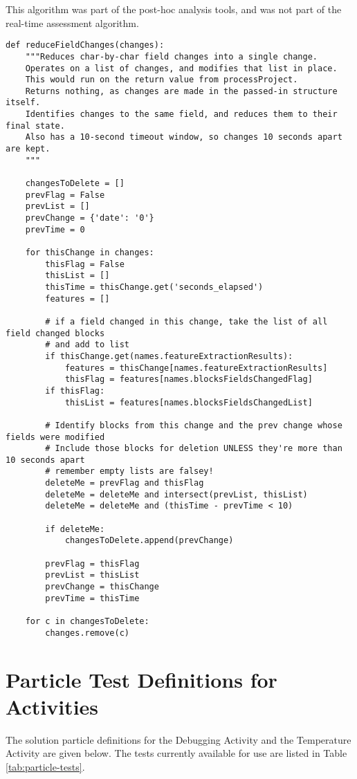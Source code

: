 This algorithm was part of the post-hoc analysis tools, and was not part of the real-time assessment algorithm.
\begin{verbatim}
def reduceFieldChanges(changes):
    """Reduces char-by-char field changes into a single change.
    Operates on a list of changes, and modifies that list in place.
    This would run on the return value from processProject.
    Returns nothing, as changes are made in the passed-in structure itself.
    Identifies changes to the same field, and reduces them to their final state.
    Also has a 10-second timeout window, so changes 10 seconds apart are kept.
    """

    changesToDelete = []
    prevFlag = False
    prevList = []
    prevChange = {'date': '0'}
    prevTime = 0

    for thisChange in changes:
        thisFlag = False
        thisList = []
        thisTime = thisChange.get('seconds_elapsed')
        features = []

        # if a field changed in this change, take the list of all field changed blocks 
        # and add to list
        if thisChange.get(names.featureExtractionResults):
            features = thisChange[names.featureExtractionResults]
            thisFlag = features[names.blocksFieldsChangedFlag]
        if thisFlag:
            thisList = features[names.blocksFieldsChangedList]

        # Identify blocks from this change and the prev change whose fields were modified
        # Include those blocks for deletion UNLESS they're more than 10 seconds apart
        # remember empty lists are falsey!
        deleteMe = prevFlag and thisFlag
        deleteMe = deleteMe and intersect(prevList, thisList)
        deleteMe = deleteMe and (thisTime - prevTime < 10)

        if deleteMe:
            changesToDelete.append(prevChange)

        prevFlag = thisFlag
        prevList = thisList
        prevChange = thisChange
        prevTime = thisTime

    for c in changesToDelete:
        changes.remove(c)
\end{verbatim}
\label{src:lst:field-change}

\section{Particle Test Definitions for Activities}
\label{app:particle_definitions}
The solution particle definitions for the Debugging Activity and the Temperature Activity are given below. The tests currently available for use are listed in Table \ref{tab:particle-tests}. 

